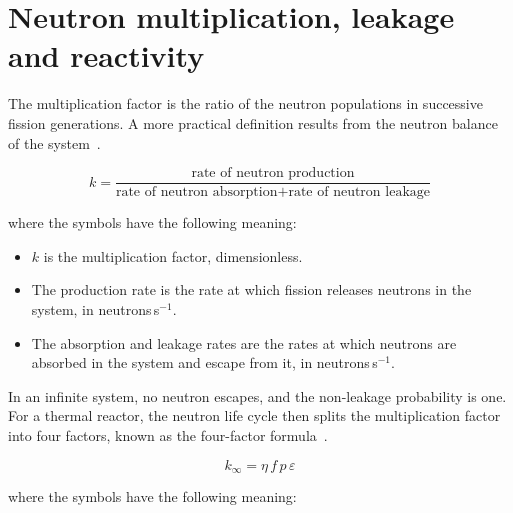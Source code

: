 \section{Neutron multiplication, leakage and reactivity}
\label{sec:bg-k}

The multiplication factor is the ratio of the neutron populations in
successive fission generations. A more practical definition results from
the neutron balance of the system~\cite{duderstadt_hamilton_1976}.

\begin{equation}
k = \frac{\text{rate of neutron production}}
         {\text{rate of neutron absorption} + \text{rate of neutron leakage}}
\label{eq:k-balance}
\end{equation}

\noindent where the symbols have the following meaning:

\begin{itemize}
  \item $k$ is the multiplication factor, dimensionless.

  \item The production rate is the rate at which fission releases
        neutrons in the system, in neutrons\,s$^{-1}$.

  \item The absorption and leakage rates are the rates at which neutrons
        are absorbed in the system and escape from it, in
        neutrons\,s$^{-1}$.
\end{itemize}

In an infinite system, no neutron escapes, and the non-leakage
probability is one. For a thermal reactor, the neutron life cycle then
splits the multiplication factor into four factors, known as the
four-factor formula~\cite{duderstadt_hamilton_1976}.

\begin{equation}
k_\infty = \eta\, f\, p\, \varepsilon
\label{eq:kinf}
\end{equation}

\noindent where the symbols have the following meaning:

